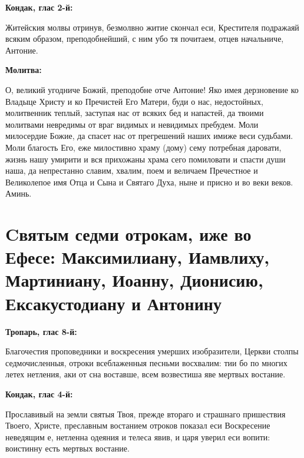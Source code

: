 \medskip


\bfseries Кондак, глас 2-й:\normalfont{}\nopagebreak


Житейския молвы отринув, безмолвно житие скончал еси, Крестителя подражаяй всяким образом, преподобнейший, с ним убо тя почитаем, отцев начальниче, Антоние.


\medskip


\bfseries Молитва:\normalfont{}\nopagebreak


О, великий угодниче Божий, преподобне отче Антоние! Яко имея дерзновение ко Владыце Христу и ко Пречистей Его Матери, буди о нас, недостойных, молитвенник теплый, заступая нас от всяких бед и напастей, да твоими молитвами невредимы от враг видимых и невидимых пребудем. Моли милосердие Божие, да спасет нас от прегрешений наших имиже веси судьбами. Моли благость Его, еже милостивно храму (дому) сему потребная даровати, жизнь нашу умирити и вся прихожаны храма сего помиловати и спасти души наша, да непрестанно славим, хвалим, поем и величаем Пречестное и Великолепое имя Отца и Сына и Святаго Духа, ныне и присно и во веки веков. Аминь.


\bigskip\bigskip\mychapterending


 

\section{Cвятым седми отрокам, иже во Ефесе: Максимилиану, Иамвлиху, Мартиниану, Иоанну, Дионисию, Ексакустодиану и Антонину}
 


\bfseries Тропарь, глас 8-й:\normalfont{}\nopagebreak


Благочестия проповедники и воскресения умерших изобразители, Церкви столпы седмочисленныя, отроки всеблаженныя песньми восхвалим: тии бо по многих летех нетления, аки от сна воставше, всем возвестиша яве мертвых востание.


\medskip


\bfseries Кондак, глас 4-й:\normalfont{}\nopagebreak


Прославивый на земли святыя Твоя, прежде втораго и страшнаго пришествия Твоего, Христе, преславным востанием отроков показал еси Воскресение неведящим е, нетленна одеяния и телеса явив, и царя уверил еси вопити: воистинну есть мертвых востание.


\medskip


